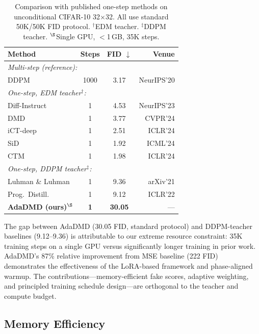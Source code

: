\documentclass{article}
\theoremstyle{plain}
\theoremstyle{remark}
\begin{document}
\begin{table}[t]
\caption{Comparison with published one-step methods on unconditional CIFAR-10 32$\times$32. All use standard 50K/50K FID protocol. $^\dagger$EDM teacher. $^\ddagger$DDPM teacher. $^\S$Single GPU, $<$1\,GB, 35K steps.}
\label{tab:comparison}
\centering
\small
\begin{tabular}{lccr}
\toprule
Method & Steps & FID $\downarrow$ & Venue \\
\midrule
\multicolumn{4}{l}{\textit{Multi-step (reference):}} \\
DDPM~\citep{ho2020denoising} & 1000 & 3.17 & NeurIPS'20 \\
\midrule
\multicolumn{4}{l}{\textit{One-step, EDM teacher$^\dagger$:}} \\
Diff-Instruct~\citep{luo2024diffinstruct} & 1 & 4.53 & NeurIPS'23 \\
DMD~\citep{yin2024onestep} & 1 & 3.77 & CVPR'24 \\
iCT-deep~\citep{song2024improved} & 1 & 2.51 & ICLR'24 \\
SiD~\citep{zhou2024score} & 1 & 1.92 & ICML'24 \\
CTM~\citep{kim2024consistency} & 1 & 1.98 & ICLR'24 \\
\midrule
\multicolumn{4}{l}{\textit{One-step, DDPM teacher$^\ddagger$:}} \\
Luhman \& Luhman~\citep{luhman2021knowledge} & 1 & 9.36 & arXiv'21 \\
Prog.\ Distill.~\citep{salimans2022progressive} & 1 & 9.12 & ICLR'22 \\
\textbf{AdaDMD (ours)}$^\S$ & \textbf{1} & \textbf{30.05} & --- \\
\bottomrule
\end{tabular}
\end{table}

The gap between AdaDMD (30.05 FID, standard protocol) and DDPM-teacher baselines (9.12--9.36) is attributable to our extreme resource constraint: 35K training steps on a single GPU versus significantly longer training in prior work. AdaDMD's 87\% relative improvement from MSE baseline (222 FID) demonstrates the effectiveness of the LoRA-based framework and phase-aligned warmup. The contributions---memory-efficient fake scores, adaptive weighting, and principled training schedule design---are orthogonal to the teacher and compute budget.

\subsection{Memory Efficiency}
\label{sec:memory}
\end{document}
